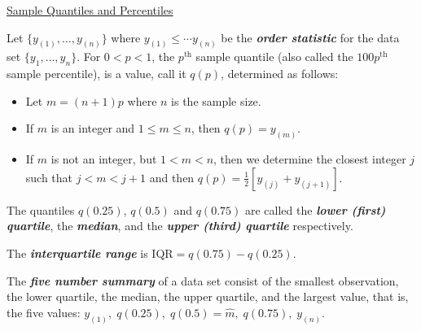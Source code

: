 \underline{Sample Quantiles and Percentiles}
\begin{defbox}
    \begin{definition}
        Let $ \{y_{(1)},\ldots ,y_{(n)}\} $ where $ y_{(1)}\leqslant \cdots y_{(n)} $
        be the \textbf{\emph{order statistic}} for the data set $ \{y_1,\ldots ,y_n\} $.
        For $ 0<p<1 $, the $ p^{\text{th}} $ sample quantile (also called the $ 100p^{\text{th}} $
        sample percentile), is a value, call it $ q(p) $, determined as follows:
        \begin{itemize}
            \item Let $ m=(n+1)p $ where $ n $ is the sample size.
            \item If $ m $ is an integer and $ 1\leqslant m\leqslant n $, then $ q(p)=y_{(m)} $.
            \item If $ m $ is not an integer, but $ 1<m<n $, then we determine the closest integer $ j $ such
                  that $ j < m < j+1 $ and then $ q(p)=\frac{1}{2} \left[ y_{(j)}+y_{(j+1)} \right] $.
        \end{itemize}
    \end{definition}
\end{defbox}

\begin{defbox}
    \begin{definition}
        The quantiles $ q(0.25) $, $ q(0.5) $ and $ q(0.75) $ are called the
        \textbf{\emph{lower (first) quartile}}, the \textbf{\emph{median}},
        and the \textbf{\emph{upper (third) quartile}} respectively.
    \end{definition}
\end{defbox}

\begin{defbox}
    \begin{definition}
        The \textbf{\emph{interquartile range}} is $ \text{IQR}=q(0.75)-q(0.25) $.
    \end{definition}
\end{defbox}

\begin{defbox}
    \begin{definition}
        The \textbf{\emph{five number summary}} of a data set consist of the smallest observation,
        the lower quartile, the median, the upper quartile, and the largest value, that is,
        the five values: $ y_{(1)},\;q(0.25),\;q(0.5)=\hat{m},\;q(0.75),\;y_{(n)} $.
    \end{definition}
\end{defbox}

